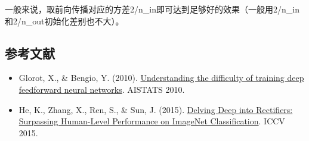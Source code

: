 一般来说，取前向传播对应的方差2/n\_in即可达到足够好的效果（一般用2/n\_in和2/n\_out初始化差别也不大）。

\FloatBarrier
{}
\hypertarget{ux53c2ux8003ux6587ux732e-9}{%
\subsection{参考文献}\label{ux53c2ux8003ux6587ux732e-9}}

\vspace{0.25em}
\begin{itemize}
\tightlist
\item
  Glorot, X., \& Bengio, Y. (2010). \href{https://proceedings.mlr.press/v9/glorot10a.html}{Understanding the difficulty of training deep feedforward neural networks}. AISTATS 2010.
\item
  He, K., Zhang, X., Ren, S., \& Sun, J. (2015). \href{https://arxiv.org/abs/1502.01852}{Delving Deep into Rectifiers: Surpassing Human-Level Performance on ImageNet Classification}. ICCV 2015.
\end{itemize}

\clearpage
